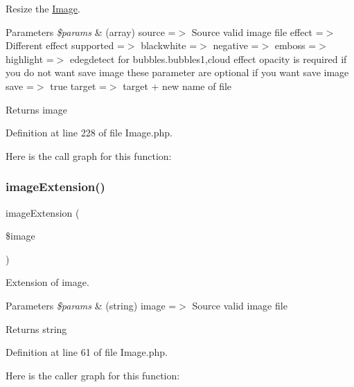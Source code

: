 Resize the \mbox{\hyperlink{class_zest_1_1_image_1_1_image}{Image}}.


\begin{DoxyParams}{Parameters}
{\em \$params} & (array) \textquotesingle{}source\textquotesingle{} =$>$ Source valid image file \textquotesingle{}effect\textquotesingle{} =$>$ Different effect supported =$>$ blackwhite =$>$ negative =$>$ emboss =$>$ highlight =$>$ edegdetect for bubbles.\+bubbles1,cloud effect opacity is required if you do not want save image these parameter are optional if you want save image \textquotesingle{}save\textquotesingle{} =$>$ true \textquotesingle{}target\textquotesingle{} =$>$ target + new name of file\\
\hline
\end{DoxyParams}
\begin{DoxyReturn}{Returns}
image 
\end{DoxyReturn}


Definition at line 228 of file Image.\+php.

Here is the call graph for this function\+:
\mbox{\label{class_zest_1_1_image_1_1_image_a7c9ed1b4d046d3b7048a341087912253}} 
\subsubsection{\texorpdfstring{image\+Extension()}{imageExtension()}}
{\footnotesize\ttfamily image\+Extension (\begin{DoxyParamCaption}\item[{}]{\$image }\end{DoxyParamCaption})}

Extension of image.


\begin{DoxyParams}{Parameters}
{\em \$params} & (string) \textquotesingle{}image\textquotesingle{} =$>$ Source valid image file\\
\hline
\end{DoxyParams}
\begin{DoxyReturn}{Returns}
string 
\end{DoxyReturn}


Definition at line 61 of file Image.\+php.

Here is the caller graph for this function\+:
\mbox{\label{class_zest_1_1_image_1_1_image_a8deb9e4b3f1858d4515dad7b6de856d2}} 
